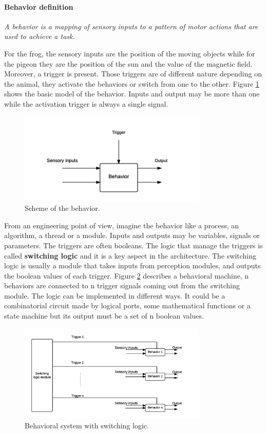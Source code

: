 \paragraph{Behavior definition} \textit{A behavior is a mapping of sensory inputs to a pattern of motor actions that are used to achieve a task.} \newline

\noindent
For the frog, the sensory inputs are the position of the moving objects while for the pigeon they are the position of the sun and the value of the magnetic field. Moreover, a trigger is present. Those triggers are of different nature depending on the animal, they activate the behaviors or switch from one to the other. Figure \ref{figure:behavior} shows the basic model of the behavior. Inputs and output may be more than one while the activation trigger is always a single signal. 
\begin{figure}[h]
\centering
 \includegraphics[width=0.8\textwidth]{behavior.png}
 \caption[Behavior definition]{Scheme of the behavior.}
 \label{figure:behavior}
\end{figure}
From an engineering point of view, imagine the behavior like a process, an algorithm, a thread or a module. Inputs and outputs may be variables, signals or parameters. The triggers are often booleans. The logic that manage the triggers is called \textbf{switching logic} and it is a key aspect in the architecture. The switching logic is usually a module that takes inputs from perception modules, and outputs the boolean values of each trigger. Figure \ref{figure:switch} describes a behavioral machine, n behaviors are connected to n trigger signals coming out from the switching module. The logic can be implemented in different ways. It could be a combinatorial circuit made by logical ports, some mathematical functions or a state machine but its output must be a set of n boolean values. 
\begin{figure}[h]
\centering
 \includegraphics[width=0.8\textwidth]{switch.png}
 \caption[Switching logic]{Behavioral system with switching logic.}
 \label{figure:switch}
\end{figure}

